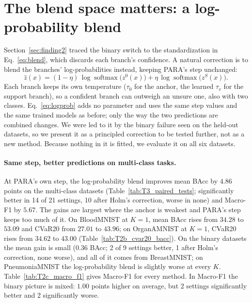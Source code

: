 \section{The blend space matters: a log-probability blend}\label{sec:finding4}

Section~\ref{sec:finding2} traced the binary switch to the standardization in Eq.~\eqref{eq:blend}, which discards each branch's confidence.
A natural correction is to blend the branches' log-probabilities instead, keeping PARA's step unchanged:
\begin{equation}
  \hat z(x) = (1 - \eta)\,\log \operatorname{softmax}\big(z^0(x)\big) + \eta\,\log \operatorname{softmax}\big(z^S(x)\big).
  \label{eq:logprob}
\end{equation}
Each branch keeps its own temperature ($\tau_0$ for the anchor, the learned $\tau_v$ for the support branch),
so a confident branch can outweigh an unsure one, also with two classes.
Eq.~\eqref{eq:logprob} adds no parameter and uses the same step values and the same trained models as before;
only the way the two predictions are combined changes.
We were led to it by the binary failure seen on the held-out datasets, so we present it as a principled correction to be tested further,
not as a new method.
Because nothing in it is fitted, we evaluate it on all six datasets.

\paragraph{Same step, better predictions on multi-class tasks.}
At PARA's own step, the log-probability blend improves mean BAcc by $4.86$ points on the multi-class datasets
(Table~\ref{tab:T3_paired_tests}; significantly better in 14 of 21 settings, 10 after Holm's correction, worse in none)
and Macro-F1 by $5.67$.
The gains are largest where the anchor is weakest and PARA's step keeps too much of it.
On BloodMNIST at $K = 1$, mean BAcc rises from $34.28$ to $53.09$ and CVaR20 from $27.01$ to $43.96$;
on OrganAMNIST at $K = 1$, CVaR20 rises from $34.62$ to $43.00$ (Table~\ref{tab:T2b_cvar20_bacc}).
On the binary datasets the mean gain is small ($0.36$ BAcc; 2 of 9 settings better, 1 after Holm's correction, none worse),
and all of it comes from BreastMNIST; on PneumoniaMNIST the log-probability blend is slightly worse at every $K$.
Table~\ref{tab:T2c_macro_f1} gives Macro-F1 for every method.
In Macro-F1 the binary picture is mixed: $1.00$ points higher on average, but 2 settings significantly better and 2 significantly worse.

